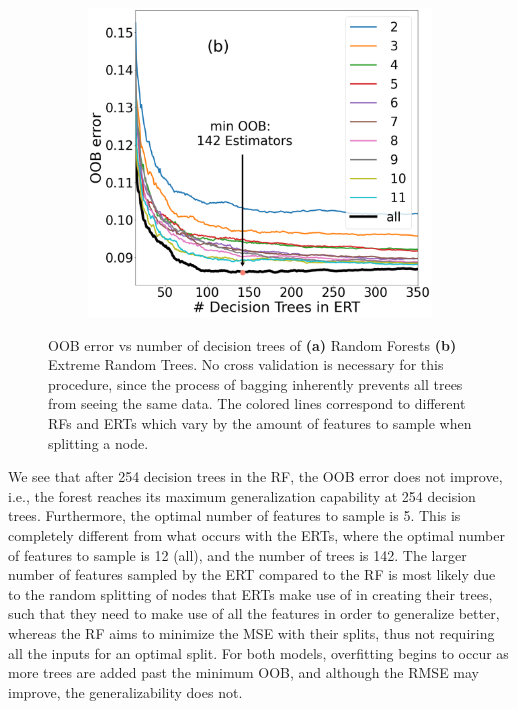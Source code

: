 \documentclass[a4paper, twoside, final, 12pt]{article}
\begin{document}
{\begin{figure}[h!]
\begin{subfigure}{0.48\linewidth}
	\end{subfigure}
	\begin{subfigure}{0.5\linewidth}
		\centering
		\includegraphics[scale=0.19]{./src/ERT_oob_error_v2}
	\end{subfigure}
	\caption{OOB error vs number of decision trees of \textbf{(a)} Random Forests \textbf{(b)} Extreme Random Trees. No cross validation is necessary for this procedure, since the process of bagging inherently prevents all trees from seeing the same data. The colored lines correspond to different RFs and ERTs which vary by the amount of features to sample when splitting a node.}
	\label{fig:RF_exp}
\end{figure}

We see that after 254 decision trees in the RF, the OOB error does not improve, i.e., the forest reaches its maximum generalization capability at 254 decision trees. Furthermore, the optimal number of features to sample is 5. This is completely different from what occurs with the ERTs, where the optimal number of features to sample is 12 (all), and the number of trees is 142. The larger number of features sampled by the ERT compared to the RF is most likely due to the random splitting of nodes that ERTs make use of in creating their trees, such that they need to make use of all the features in order to generalize better, whereas the RF aims to minimize the MSE with their splits, thus not requiring all the inputs for an optimal split. For both models, overfitting begins to occur as more trees are added past the minimum OOB, and although the RMSE may improve, the generalizability does not.


}
\end{document}
